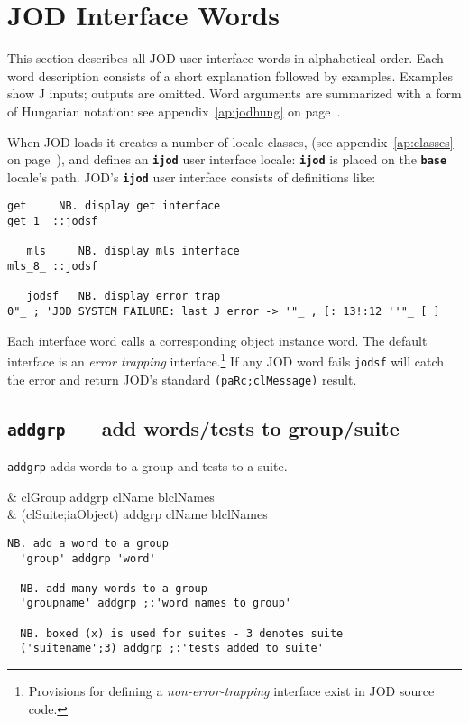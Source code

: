 \section{JOD Interface Words}\label{ss:jodwords}

This section describes all JOD user interface words in alphabetical
order.  Each  word description consists of a short explanation followed
by examples.  Examples show J inputs; outputs
are omitted.  Word arguments are summarized with a form of Hungarian
notation: see appendix~\ref{ap:jodhung} on
page~\pageref{ap:jodhung}.

When JOD loads it creates a number of locale classes,  (see appendix~\ref{ap:classes}
on page~\pageref{ap:classes}), and defines an \texttt{\textbf{ijod}} user 
interface locale: \texttt{\textbf{ijod}} 
is placed on the \texttt{\textbf{base}} locale's path.
JOD's \texttt{\textbf{ijod}} user interface consists of definitions like:  
\begin{lstlisting}[frame=single,framerule=0pt]
   get     NB. display get interface
get_1_ ::jodsf
    
   mls     NB. display mls interface
mls_8_ ::jodsf

   jodsf   NB. display error trap
0"_ ; 'JOD SYSTEM FAILURE: last J error -> '"_ , [: 13!:12 ''"_ [ ]   
\end{lstlisting}
Each interface word calls a corresponding object instance word.  The
default interface is an \emph{error trapping} interface.\footnote{Provisions
for defining a \emph{non-error-trapping} interface exist in JOD source code.}  If any JOD
word fails \texttt{jodsf} will catch the error and return JOD's standard \verb|(paRc;clMessage)|
result.

\subsection{\texttt{addgrp} --- add words/tests to group/suite}

\texttt{addgrp} adds words to a group and tests to a suite. 

\begin{wordhead}
\dyad & clGroup addgrp clName \argsep blclNames \\
      & (clSuite;iaObject) addgrp clName \argsep blclNames \\
\end{wordhead}
\begin{lstlisting}[frame=single,framerule=0pt]
  NB. add a word to a group
  'group' addgrp 'word' 

  NB. add many words to a group 
  'groupname' addgrp ;:'word names to group'

  NB. boxed (x) is used for suites - 3 denotes suite
  ('suitename';3) addgrp ;:'tests added to suite'
\end{lstlisting}

